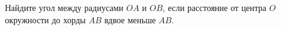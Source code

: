 \begin{ex}
	\begin{condition}
		Найдите угол между радиусами \( OA  \) и \( OB \), если расстояние от центра \( O  \) окружности до хорды \( AB \) вдвое меньше \( AB \).
	\end{condition}
\end{ex}
